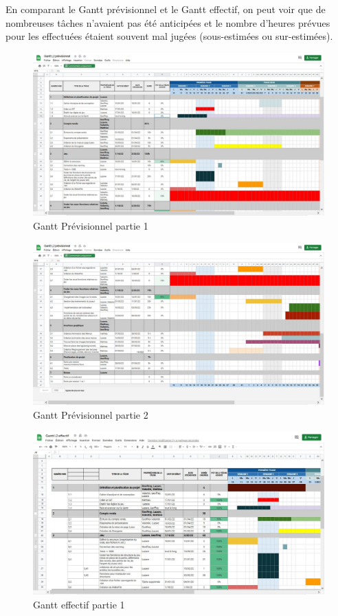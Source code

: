 \documentclass[a4paper,11pt]{article}
\begin{document}
En comparant le Gantt prévisionnel et le Gantt effectif, on peut voir que de nombreuses tâches n'avaient pas été anticipées
et le nombre d'heures prévues pour les effectuées étaient souvent mal jugées (sous-estimées ou sur-estimées).
\begin{figure}[h!]
\centering
\includegraphics [width=1\textwidth]{image10.jpg} 
\caption {\label{image} Gantt Prévisionnel partie 1}
\end{figure}
 \smallbreak
\begin{figure}[h!]
\centering
\includegraphics [width=1\textwidth]{image11.jpg} 
\caption {\label{image} Gantt Prévisionnel partie 2}
\end{figure}
 \smallbreak
\begin{figure}[h!]
\centering
\includegraphics [width=1\textwidth]{image7.jpg} 
\caption {\label{image} Gantt effectif partie 1}
\end{figure}
\end{document}
